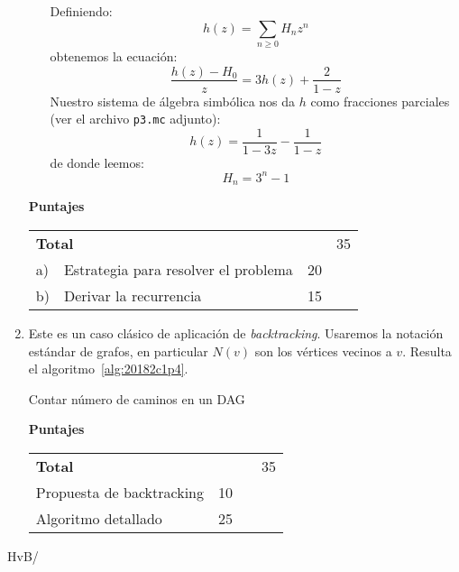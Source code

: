 \documentclass[english, spanish, fleqn]{article}
\begin{document}
\begin{enumerate}
\begin{enumerate}
      Definiendo:
      \begin{equation*}
	h(z)
	  = \sum_{n \ge 0} H_n z^n
      \end{equation*}
      obtenemos la ecuación:
      \begin{equation*}
	\frac{h(z) - H_0}{z}
	  = 3 h(z) + \frac{2}{1 - z}
      \end{equation*}
      Nuestro sistema de álgebra simbólica nos da
      \(h\) como fracciones parciales
      (ver el archivo \texttt{p3.mc} adjunto):
      \begin{equation*}
	h(z)
	  = \frac{1}{1 - 3 z} - \frac{1}{1 - z}
      \end{equation*}
      de donde leemos:
      \begin{equation*}
	H_n
	  = 3^n - 1
      \end{equation*}
    \end{enumerate}

    \vspace*{2\baselineskip}
    \begin{minipage}{1.0\linewidth}
      {\Large\textbf{Puntajes}}\\[0.5\baselineskip]
      \begin{tabular}{l@{\;}lrr}
	\multicolumn{2}{l}{\textbf{Total}}		 &    & 35\\
	a) & Estrategia para resolver el problema	 & 20 &	  \\
	b) & Derivar la recurrencia			 & 15 &
      \end{tabular}
    \end{minipage}
\pagebreak[4]
  \item %
    Este es un caso clásico
    de aplicación de \emph{\foreignlanguage{english}{backtracking}}.
    Usaremos la notación estándar de grafos,
    en particular \(N(v)\) son los vértices vecinos a \(v\).
    Resulta el algoritmo~\ref{alg:20182c1p4}.
      \begin{algorithm}[ht]
	\DontPrintSemicolon

	\caption{Contar número de caminos en un DAG}
	\label{alg:20182c1p4}
      \end{algorithm}


    \vspace*{2\baselineskip}
    \begin{minipage}{1.0\linewidth}
      {\Large\textbf{Puntajes}}\\[0.5\baselineskip]
      \begin{tabular}{l@{\;}lrr}
	\multicolumn{2}{l}{\textbf{Total}}		     &	  & 35 \\
	Propuesta de backtracking			     & 10 &    \\
	Algoritmo detallado				     & 25 &
      \end{tabular}
    \end{minipage}
  \end{enumerate}
  \vfill\hfill HvB/\LaTeXe
\end{document}
